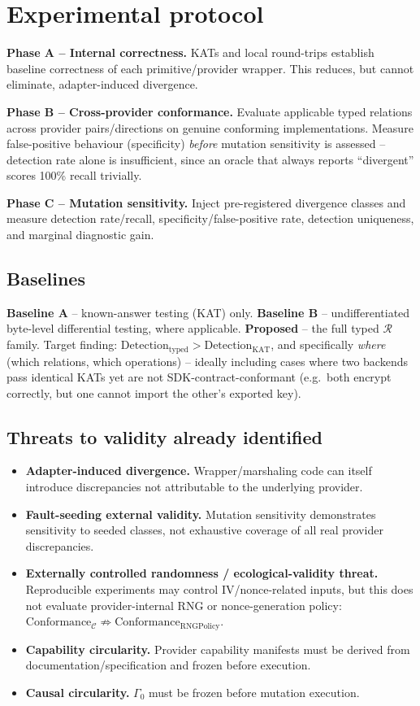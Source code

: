 \documentclass[11pt,a4paper]{article}
\begin{document}
\section{Experimental protocol}
\textbf{Phase A -- Internal correctness.} KATs and local round-trips establish baseline correctness of each primitive/provider wrapper. This reduces, but cannot eliminate, adapter-induced divergence.

\textbf{Phase B -- Cross-provider conformance.} Evaluate applicable typed relations across provider pairs/directions on genuine conforming implementations. Measure false-positive behaviour (specificity) \emph{before} mutation sensitivity is assessed -- detection rate alone is insufficient, since an oracle that always reports ``divergent'' scores 100\% recall trivially.

\textbf{Phase C -- Mutation sensitivity.} Inject pre-registered divergence classes and measure detection rate/recall, specificity/false-positive rate, detection uniqueness, and marginal diagnostic gain.

\subsection{Baselines}
\textbf{Baseline A} -- known-answer testing (KAT) only. \textbf{Baseline B} -- undifferentiated byte-level differential testing, where applicable. \textbf{Proposed} -- the full typed $\mathcal{R}$ family. Target finding: $\text{Detection}_{\text{typed}} > \text{Detection}_{\text{KAT}}$, and specifically \emph{where} (which relations, which operations) -- ideally including cases where two backends pass identical KATs yet are not SDK-contract-conformant (e.g.\ both encrypt correctly, but one cannot import the other's exported key).

\subsection{Threats to validity already identified}\label{sec:threats}
\begin{itemize}
\item \textbf{Adapter-induced divergence.} Wrapper/marshaling code can itself introduce discrepancies not attributable to the underlying provider.
\item \textbf{Fault-seeding external validity.} Mutation sensitivity demonstrates sensitivity to seeded classes, not exhaustive coverage of all real provider discrepancies.
\item \textbf{Externally controlled randomness / ecological-validity threat.} Reproducible experiments may control IV/nonce-related inputs, but this does not evaluate provider-internal RNG or nonce-generation policy: $\text{Conformance}_{\mathcal{C}} \not\Rightarrow \text{Conformance}_{\text{RNGPolicy}}$.
\item \textbf{Capability circularity.} Provider capability manifests must be derived from documentation/specification and frozen before execution.
\item \textbf{Causal circularity.} $\Gamma_0$ must be frozen before mutation execution.
\end{itemize}
\end{document}
